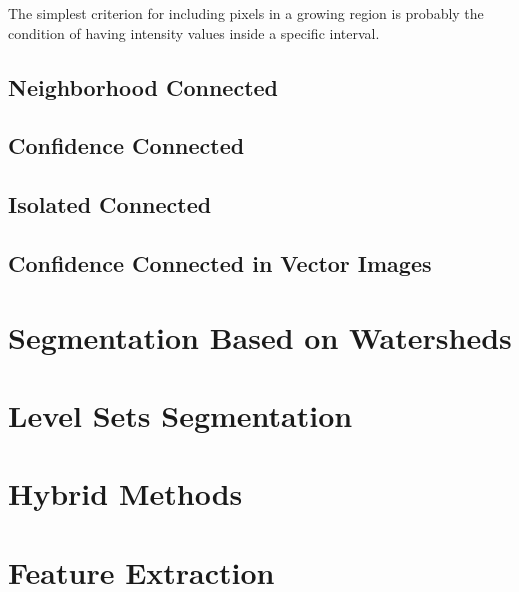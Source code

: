 The simplest criterion for including pixels in a growing region is
probably the condition of having intensity values inside a specific
interval.

\label{sec:ConnectedThreshold}
\ifitkFullVersion 

\fi


\subsection{Neighborhood Connected}
\label{sec:NeighborhoodConnectedImageFilter}
\ifitkFullVersion 

\fi



\subsection{Confidence Connected}
\label{sec:ConfidenceConnected}
\ifitkFullVersion 

\fi


\subsection{Isolated Connected}
\label{sec:IsolatedConnected}
\ifitkFullVersion 

\fi


\subsection{Confidence Connected in Vector Images}
\label{sec:VectorConfidenceConnected}
\ifitkFullVersion 

\fi


\section{Segmentation Based on Watersheds}
\label{sec:WatershedSegmentation}
\ifitkFullVersion 

\fi


\clearpage

\section{Level Sets Segmentation}
\label{sec:LevelSetsSegmentation}
\ifitkFullVersion 

\fi


\section{Hybrid Methods} 
\label{sec:HybridSegmentationMethods}

\ifitkFullVersion 

\fi


\section{Feature Extraction} 
\label{sec:FeatureExtractionMethods}

\ifitkFullVersion 

\fi


